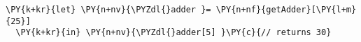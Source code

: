 \begin{Verbatim}[commandchars=\\\{\}]
\PY{k+kr}{let} \PY{n+nv}{\PYZdl{}adder }= \PY{n+nf}{getAdder}[\PY{l+m}{25}]
  \PY{k+kr}{in} \PY{n+nv}{\PYZdl{}adder[5] }\PY{c}{// returns 30}
\end{Verbatim}
